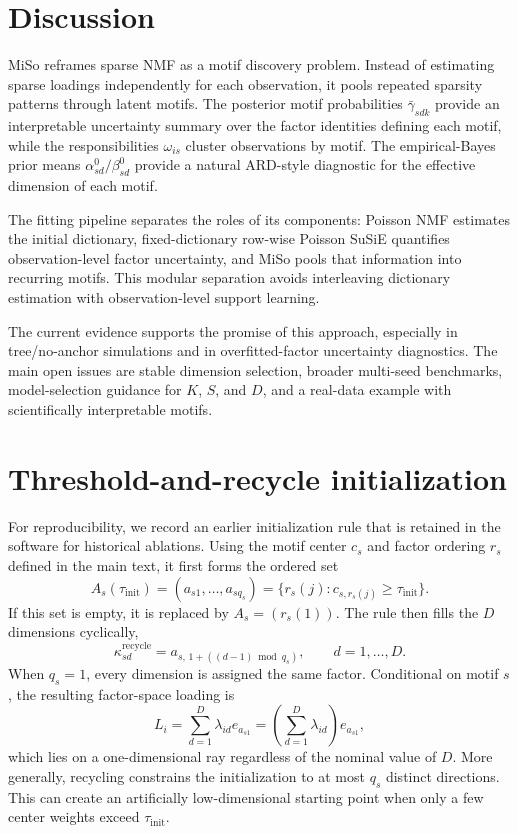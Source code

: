 \documentclass[11pt]{article}
\theoremstyle{plain}
\theoremstyle{definition}
\begin{document}
\section{Discussion}

MiSo reframes sparse NMF as a motif discovery problem. Instead of estimating
sparse loadings independently for each observation, it pools repeated sparsity
patterns through latent motifs. The posterior motif probabilities
$\bar{\gamma}_{sdk}$ provide an interpretable uncertainty summary over the
factor identities defining each motif, while the responsibilities $\omega_{is}$
cluster observations by motif. The empirical-Bayes prior means
$\alpha_{sd}^0/\beta_{sd}^0$ provide a natural ARD-style diagnostic for the
effective dimension of each motif.

The fitting pipeline separates the roles of its components: Poisson NMF
estimates the initial dictionary, fixed-dictionary row-wise Poisson SuSiE
quantifies observation-level factor uncertainty, and MiSo pools that
information into recurring motifs. This modular separation avoids interleaving
dictionary estimation with observation-level support learning.

The current evidence supports the promise of this approach, especially in
tree/no-anchor simulations and in overfitted-factor uncertainty diagnostics.
The main open issues are stable dimension selection, broader multi-seed
benchmarks, model-selection guidance for $K$, $S$, and $D$, and a real-data
example with scientifically interpretable motifs.

\clearpage
\appendix

\section{Threshold-and-recycle initialization}
\label{app:threshold-recycle}

For reproducibility, we record an earlier initialization rule that is retained
in the software for historical ablations. Using the motif center $c_s$ and
factor ordering $r_s$ defined in the main text, it first forms the ordered set
\[
  A_s(\tau_{\mathrm{init}})
  =
  (a_{s1},\ldots,a_{sq_s})
  =
  \{r_s(j):c_{s,r_s(j)}\geq\tau_{\mathrm{init}}\}.
\]
If this set is empty, it is replaced by $A_s=(r_s(1))$. The rule then fills the
$D$ dimensions cyclically,
\[
  \kappa_{sd}^{\mathrm{recycle}}
  =
  a_{s,\,1+((d-1)\bmod q_s)},
  \qquad d=1,\ldots,D.
\]
When $q_s=1$, every dimension is assigned the same factor. Conditional on motif
$s$, the resulting factor-space loading is
\[
  L_i
  =
  \sum_{d=1}^D\lambda_{id}e_{a_{s1}}
  =
  \left(\sum_{d=1}^D\lambda_{id}\right)e_{a_{s1}},
\]
which lies on a one-dimensional ray regardless of the nominal value of $D$.
More generally, recycling constrains the initialization to at most $q_s$
distinct directions. This can create an artificially low-dimensional starting
point when only a few center weights exceed $\tau_{\mathrm{init}}$.



\end{document}
